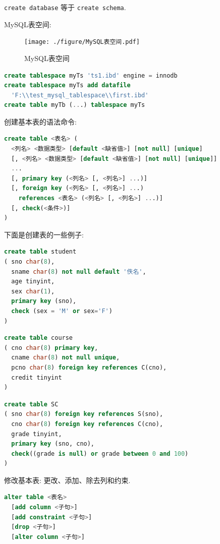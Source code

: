 \verb|create database| 等于 \verb|create schema|.

MySQL表空间:

\begin{figure}[H]
    \centering
    \texttt{[image: ./figure/MySQL表空间.pdf]}
    \caption{MySQL表空间}
\end{figure}

\begin{lstlisting}[language=SQL]
create tablespace myTs 'ts1.ibd' engine = innodb
create tablespace myTs add datafile
  'F:\\test_mysql_tablespace\\first.ibd'
create table myTb (...) tablespace myTs
\end{lstlisting}

创建基本表的语法命令:
\begin{lstlisting}[language=SQL]
create table <表名> (
  <列名> <数据类型> [default <缺省值>] [not null] [unique]
  [, <列名> <数据类型> [default <缺省值>] [not null] [unique]]
  ...
  [, primary key (<列名> [, <列名>] ...)]
  [, foreign key (<列名> [, <列名>] ...)
    references <表名> (<列名> [, <列名>] ...)]
  [, check(<条件>)]
)
\end{lstlisting}

下面是创建表的一些例子:
\begin{lstlisting}[language=SQL]
create table student
( sno char(8),
  sname char(8) not null default '佚名',
  age tinyint,
  sex char(1),
  primary key (sno),
  check (sex = 'M' or sex='F')
)
\end{lstlisting}

\begin{lstlisting}[language=SQL]
create table course
( cno char(8) primary key,
  cname char(8) not null unique,
  pcno char(8) foreign key references C(cno),
  credit tinyint
)
\end{lstlisting}

\begin{lstlisting}[language=SQL]
create table SC
( sno char(8) foreign key references S(sno),
  cno char(8) foreign key references C(cno),
  grade tinyint,
  primary key (sno, cno),
  check((grade is null) or grade between 0 and 100)
)
\end{lstlisting}

修改基本表: 更改、添加、除去列和约束.
\begin{lstlisting}[language=SQL]
alter table <表名>
  [add column <子句>]
  [add constraint <子句>]
  [drop <子句>]
  [alter column <子句>]
\end{lstlisting}

